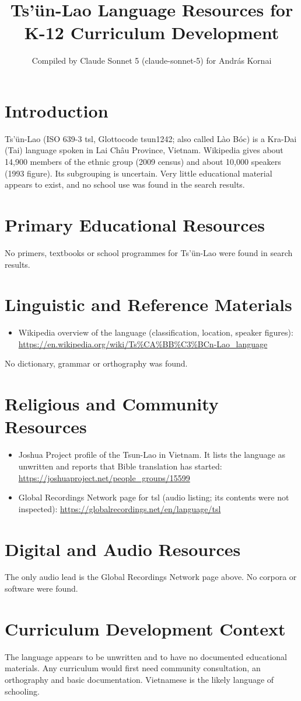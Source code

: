 \documentclass[12pt]{article}
\title{Ts\textquoteright\"un-Lao Language Resources for K-12 Curriculum Development}
\author{Compiled by Claude Sonnet 5 (claude-sonnet-5) for Andr\'as Kornai}
\date{}
\begin{document}
\maketitle

\section{Introduction}
Ts\textquoteright\"un-Lao (ISO 639-3 tsl, Glottocode tsun1242; also called L\`ao B\'oc) is a Kra-Dai (Tai) language spoken in Lai Ch\^au Province, Vietnam. Wikipedia gives about 14,900 members of the ethnic group (2009 census) and about 10,000 speakers (1993 figure). Its subgrouping is uncertain. Very little educational material appears to exist, and no school use was found in the search results.

\section{Primary Educational Resources}
No primers, textbooks or school programmes for Ts\textquoteright\"un-Lao were found in search results.

\section{Linguistic and Reference Materials}
\begin{itemize}
\item Wikipedia overview of the language (classification, location, speaker figures): \url{https://en.wikipedia.org/wiki/Ts%CA%BB%C3%BCn-Lao_language}
\end{itemize}
No dictionary, grammar or orthography was found.

\section{Religious and Community Resources}
\begin{itemize}
\item Joshua Project profile of the Tsun-Lao in Vietnam. It lists the language as unwritten and reports that Bible translation has started: \url{https://joshuaproject.net/people_groups/15599}
\item Global Recordings Network page for tsl (audio listing; its contents were not inspected): \url{https://globalrecordings.net/en/language/tsl}
\end{itemize}

\section{Digital and Audio Resources}
The only audio lead is the Global Recordings Network page above. No corpora or software were found.

\section{Curriculum Development Context}
The language appears to be unwritten and to have no documented educational materials. Any curriculum would first need community consultation, an orthography and basic documentation. Vietnamese is the likely language of schooling.
\end{document}
